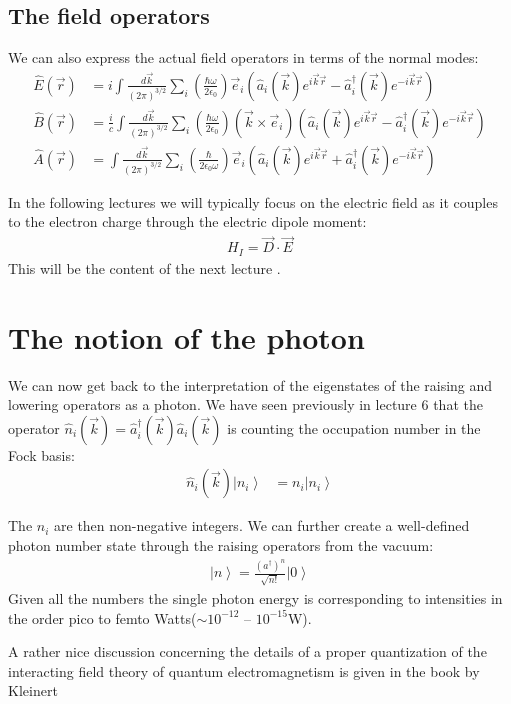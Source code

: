 \documentclass[10pt]{article}
\let\cite\citep
\providecommand\citep{\cite}
\newcommand{\ket}[1]{\ensuremath{\left|#1\right\rangle}}
\begin{document}
\subsection{The field operators}
We can also express the actual field operators in terms of the normal modes:
\begin{align}
\hat{E}(\vec{r})&= i \int \frac{d\vec{k}}{(2\pi)^{3/2}}\sum_i \left(\frac{\hbar\omega}{2\epsilon_0}\right)\vec{e}_i\left(\hat{a}_i(\vec{k})e^{i\vec{k}\vec{r}}-\hat{a}^\dag_i(\vec{k})e^{-i\vec{k}\vec{r}}\right)\\
\hat{B}(\vec{r})&= \frac{i}{c} \int \frac{d\vec{k}}{(2\pi)^{3/2}}\sum_i \left(\frac{\hbar\omega}{2\epsilon_0}\right)(\vec{k}\times\vec{e}_i)\left(\hat{a}_i(\vec{k})e^{i\vec{k}\vec{r}}-\hat{a}^\dag_i(\vec{k})e^{-i\vec{k}\vec{r}}\right)\\
\hat{A}(\vec{r})&=  \int \frac{d\vec{k}}{(2\pi)^{3/2}}\sum_i \left(\frac{\hbar}{2\epsilon_0\omega}\right)\vec{e}_i\left(\hat{a}_i(\vec{k})e^{i\vec{k}\vec{r}}+\hat{a}^\dag_i(\vec{k})e^{-i\vec{k}\vec{r}}\right)
\end{align}

In the following lectures we will typically focus on the electric field as it couples to the electron charge through the electric dipole moment:
\begin{align}
H_I = \vec{D}\cdot\vec{E}
\end{align}
This will be the content of the next lecture \cite{states}.

\section{The notion of the photon}
We can now get back to the interpretation of the eigenstates of the raising and lowering operators as a photon. We have seen previously in lecture 6\cite{Jendrzejewski} that the operator $\hat{n}_i(\vec{k}) = \hat{a}_i^\dag (\vec{k}) \hat{a}_i(\vec{k}) $ is counting the occupation number in the Fock basis:
\begin{align}
\hat{n}_i(\vec{k}) \ket{n_i}&= n_i\ket{n_i}
\end{align}

The $n_i$ are then non-negative integers. We can further create a well-defined photon number state through the raising operators from the vacuum:
\begin{align}
\ket{n} = \frac{(a^\dag)^n}{\sqrt{n!}}\ket{0}
\end{align}
Given all the numbers the single photon energy is corresponding to intensities in the order pico to femto Watts($\sim 10^{-12}$ -- $10^{-15}$W). 

A rather nice discussion concerning the details of a proper quantization of the interacting field theory of quantum electromagnetism is given in the book by Kleinert \cite{electrodynamics}

\FloatBarrier


\end{document}
